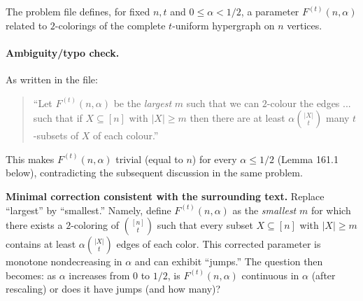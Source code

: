 The problem file defines, for fixed $n,t$ and $0\le \alpha<1/2$, a parameter $F^{(t)}(n,\alpha)$ related to $2$-colorings of the complete $t$-uniform hypergraph on $n$ vertices.

\paragraph{Ambiguity/typo check.}
As written in the file:
\begin{quote}
``Let $F^{(t)}(n,\alpha)$ be the \emph{largest} $m$ such that we can $2$-colour the edges ... such that if $X\subseteq[n]$ with $|X|\ge m$ then there are at least $\alpha\binom{|X|}{t}$ many $t$-subsets of $X$ of each colour.''
\end{quote}
This makes $F^{(t)}(n,\alpha)$ trivial (equal to $n$) for every $\alpha\le 1/2$ (Lemma 161.1 below), contradicting the subsequent discussion in the same problem.

\medskip
\noindent\textbf{Minimal correction consistent with the surrounding text.}
Replace ``largest'' by ``smallest.'' Namely, define $F^{(t)}(n,\alpha)$ as the \emph{smallest} $m$ for which there exists a $2$-coloring of $\binom{[n]}{t}$ such that every subset $X\subseteq[n]$ with $|X|\ge m$ contains at least $\alpha\binom{|X|}{t}$ edges of each color.
This corrected parameter is monotone nondecreasing in $\alpha$ and can exhibit ``jumps.''
The question then becomes: as $\alpha$ increases from $0$ to $1/2$, is $F^{(t)}(n,\alpha)$ continuous in $\alpha$ (after rescaling) or does it have jumps (and how many)?

